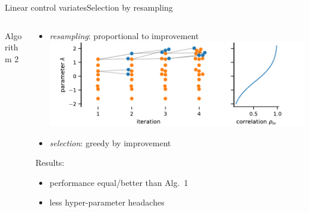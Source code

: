 \documentclass[9pt]{beamer}
\DeclareMathOperator*{\argmax}{arg\,max}
\newcommand{\bottomcite}[1]{\vspace*{\fill} {\scriptsize \parencite{#1}}}
\begin{document}
\begin{frame}{Linear control variates}{Selection by resampling}
\begin{columns}
\begin{column}{.4\textwidth}
\begin{block}{Algorithm 2}
\begin{figure}
\begin{tikzpicture}[node distance=1.3cm,
                every node/.style={fill=white, font=\sffamily}, align=center]
                \end{tikzpicture}
                \end{figure}
            \end{block}
        \end{column}
        \begin{column}{.55\textwidth}
            \begin{itemize}
                \item \emph{resampling}: proportional to improvement %
                    \includegraphics[width=\textwidth]{../gfx/resampling.pdf}
                \item \emph{selection}: greedy by improvement%
            \end{itemize}
            \vspace{2em}
            \noindent
            Results:
            \begin{itemize}
                \item performance equal/better than Alg.~1
                \item less hyper-parameter headaches
            \end{itemize}
        \end{column}
    \end{columns}
    \bottomcite{backenkohler2021variance}
\end{frame}
\end{document}
